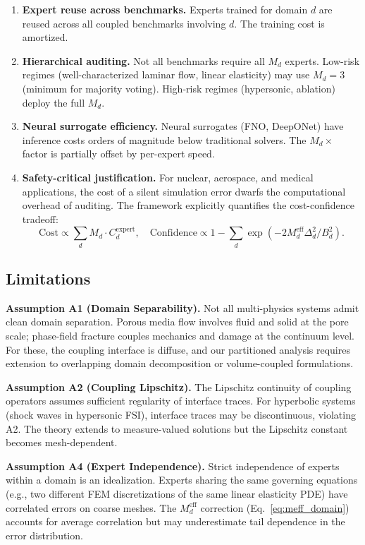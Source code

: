 \documentclass[11pt,a4paper]{article}
\theoremstyle{definition}
\begin{document}
\begin{enumerate}[label=(\roman*)]
    \item \textbf{Expert reuse across benchmarks.} Experts trained for domain $d$ are reused across all coupled benchmarks involving $d$. The training cost is amortized.
    \item \textbf{Hierarchical auditing.} Not all benchmarks require all $M_d$ experts. Low-risk regimes (well-characterized laminar flow, linear elasticity) may use $M_d = 3$ (minimum for majority voting). High-risk regimes (hypersonic, ablation) deploy the full $M_d$.
    \item \textbf{Neural surrogate efficiency.} Neural surrogates (FNO, DeepONet) have inference costs orders of magnitude below traditional solvers. The $M_d \times$ factor is partially offset by per-expert speed.
    \item \textbf{Safety-critical justification.} For nuclear, aerospace, and medical applications, the cost of a silent simulation error dwarfs the computational overhead of auditing. The framework explicitly quantifies the cost-confidence tradeoff:
    \begin{equation}
    \text{Cost} \propto \sum_{d} M_d \cdot C_d^{\mathrm{expert}}, \quad \text{Confidence} \propto 1 - \sum_d \exp(-2 M_d^{\mathrm{eff}} \Delta_d^2 / B_d^2).
    \end{equation}
\end{enumerate}

\subsection{Limitations }

\textbf{Assumption A1 (Domain Separability).} Not all multi-physics systems admit clean domain separation. Porous media flow involves fluid and solid at the pore scale; phase-field fracture couples mechanics and damage at the continuum level. For these, the coupling interface is diffuse, and our partitioned analysis requires extension to overlapping domain decomposition \cite{Toselli2005} or volume-coupled formulations.

\textbf{Assumption A2 (Coupling Lipschitz).} The Lipschitz continuity of coupling operators assumes sufficient regularity of interface traces. For hyperbolic systems (shock waves in hypersonic FSI), interface traces may be discontinuous, violating A2. The theory extends to measure-valued solutions but the Lipschitz constant becomes mesh-dependent.

\textbf{Assumption A4 (Expert Independence).} Strict independence of experts within a domain is an idealization. Experts sharing the same governing equations (e.g., two different FEM discretizations of the same linear elasticity PDE) have correlated errors on coarse meshes. The $M_d^{\mathrm{eff}}$ correction (Eq.~\ref{eq:meff_domain}) accounts for average correlation but may underestimate tail dependence in the error distribution.
\end{document}

